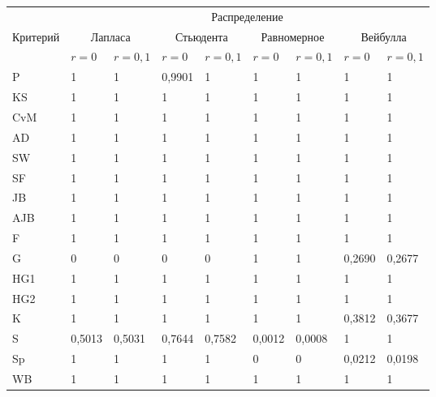 \begin{table*}\small %
\begin{center}
\parbox{370pt}{
}
\vspace*{2ex}

\begin{tabular}{|l|l|l|l|l|l|l|l|l|}
\hline
 & \multicolumn{8}{c|}{Распределение}\\
\cline{2-9}
\multicolumn{1}{|c|}{Критерий}&\multicolumn{2}{c|}{Лапласа}&\multicolumn{2}{c|}{Стьюдента}&\multicolumn{2}{c|}{Равномерное}&\multicolumn{2}{c|}{Вейбулла}\\
\cline{2-9}
&$r=0$&$r=0{,}1$&$r=0$&$r=0{,}1$&$r=0$&$r=0{,}1$&$r=0$&$r=0{,}1$\\
\hline
\hspace*{4mm}P&1&1&0,9901&1&1&1&1&1\\
\hspace*{4mm}KS&1&1&1&1&1&1&1&1\\
\hspace*{4mm}CvM&1&1&1&1&1&1&1&1\\
\hspace*{4mm}AD&1&1&1&1&1&1&1&1\\
\hspace*{4mm}SW&1&1&1&1&1&1&1&1\\
\hspace*{4mm}SF&1&1&1&1&1&1&1&1\\
\hspace*{4mm}JB&1&1&1&1&1&1&1&1\\
\hspace*{4mm}AJB&1&1&1&1&1&1&1&1\\
\hspace*{4mm}F&1&1&1&1&1&1&1&1\\
\hspace*{4mm}G&0&0&0&0&1&1&0,2690&0,2677\\
\hspace*{4mm}HG1&1&1&1&1&1&1&1&1\\
\hspace*{4mm}HG2&1&1&1&1&1&1&1&1\\
\hspace*{4mm}K&1&1&1&1&1&1&0,3812&0,3677\\
\hspace*{4mm}S&0,5013&0,5031&0,7644&0,7582&0,0012&0,0008&1&1\\
\hspace*{4mm}Sp&1&1&1&1&0&0&0,0212&0,0198\\
\hspace*{4mm}WB&1&1&1&1&1&1&1&1\\
\hline
\end{tabular}
\end{center}
\vspace*{-4pt}
\end{table*}


